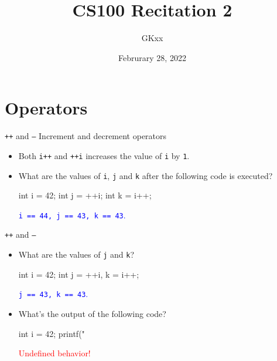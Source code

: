 \documentclass[handout]{beamer}
\title{CS100 Recitation 2}
\author{GKxx}
\date{Februrary 28, 2022}
\newcommand{\red}[1]{\textcolor{red}{#1}}
\newcommand{\blue}[1]{\textcolor{blue}{#1}}
\newcommand{\ttt}[1]{\texttt{#1}}
\begin{document}
\begin{frame}
    \titlepage
\end{frame}


\section{Operators}

\begin{frame}[fragile]{\ttt{++} and \ttt{--}}
    Increment and decrement operators
    \begin{itemize}
        \item Both \ttt{i++} and \ttt{++i} increases the value of \ttt{i} by \ttt{1}.
        \pause
        \item What are the values of \ttt{i}, \ttt{j} and \ttt{k} after the following code is executed?
        \begin{cpp}
int i = 42;
int j = ++i;
int k = i++;
        \end{cpp}
        \pause
        \blue{\ttt{i == 44, j == 43, k == 43}.}
    \end{itemize}
\end{frame}

\begin{frame}[fragile]{\ttt{++} and \ttt{--}}
    \begin{itemize}
        \item What are the values of \ttt{j} and \ttt{k}?
        \begin{cpp}
int i = 42;
int j = ++i, k = i++;
        \end{cpp}
        \pause
        \blue{\ttt{j == 43, k == 43}.}
        \pause
        \item What's the output of the following code?
        \begin{cpp}
int i = 42;
printf("%
        \end{cpp}
        \pause
        \red{Undefined behavior!}
    \end{itemize}
\end{frame}
\end{document}
